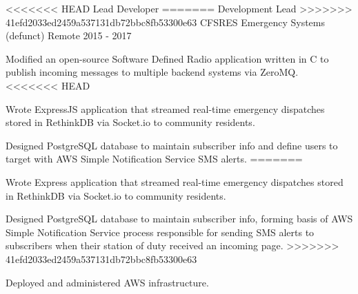 \begin{cventries}
  \cventry
<<<<<<< HEAD
    {Lead Developer} %
=======
    {Development Lead} %
>>>>>>> 41efd2033ed2459a537131db72bbc8fb53300e63
    {CFSRES Emergency Systems (defunct)} %
    {Remote} %
    {2015 - 2017} %
    {
      \begin{cvitems} %
        \item {Modified an open-source Software Defined Radio application written in C to publish incoming messages to multiple backend systems via ZeroMQ.}
<<<<<<< HEAD
        \item {Wrote ExpressJS application that streamed real-time emergency dispatches stored in RethinkDB via Socket.io to community residents.}
        \item {Designed PostgreSQL database to maintain subscriber info and define users to target with AWS Simple Notification Service SMS alerts.}
=======
        \item {Wrote Express application that streamed real-time emergency dispatches stored in RethinkDB via Socket.io to community residents.}
        \item {Designed PostgreSQL database to maintain subscriber info, forming basis of AWS Simple Notification Service process responsible for sending SMS alerts to subscribers when their station of duty received an incoming page.}
>>>>>>> 41efd2033ed2459a537131db72bbc8fb53300e63
        \item {Deployed and administered AWS infrastructure.}
      \end{cvitems}
    }


\end{cventries}
